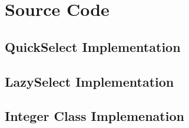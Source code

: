 \documentclass{article}
\begin{document}



\newpage

\appendix
\section{Source Code}

\label{appendix:code}
\subsection{QuickSelect Implementation}


\subsection{LazySelect Implementation}


\subsection{Integer Class Implemenation}

\end{document}
